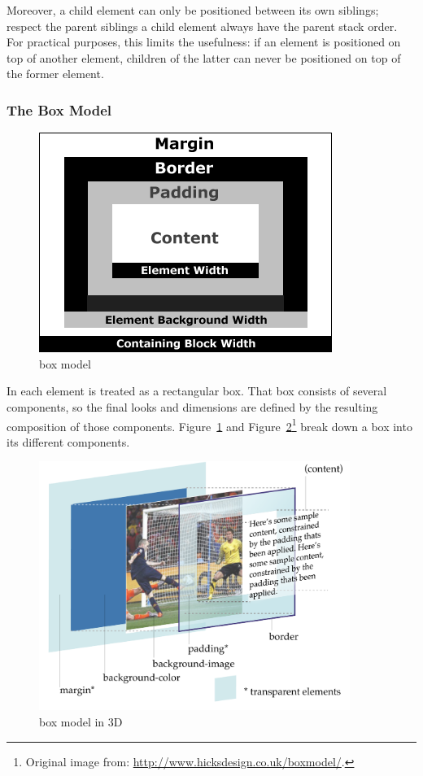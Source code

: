 Moreover, a child element can only be positioned between its own siblings; respect the parent siblings a child element always have the parent stack order.
For practical purposes, this limits the  usefulness: if an element is positioned on top of another element, children of the latter can never be positioned on top of the former element.


\subsubsection{The Box Model} %
\label{ssub:boxmodel}

\begin{figure}
  \centering
    \includegraphics[width=.48\textwidth]{figures/css-boxmodel}
  \caption{ box model}
  \label{fig:css-boxmodel}
\end{figure}

In  each element is treated as a rectangular box.
That box consists of several components, so the final looks and dimensions are defined by the resulting composition of those components.
Figure~\ref{fig:css-boxmodel} and Figure~\ref{fig:css-boxmodel-3d}\footnote{Original image from: \url{http://www.hicksdesign.co.uk/boxmodel/}.} break down a box into its different components.

\begin{figure}[htbp]
  \centering
    \includegraphics[width=0.9\textwidth]{figures/css-boxmodel-3d}
  \caption{ box model in 3D}
  \label{fig:css-boxmodel-3d}
\end{figure}


